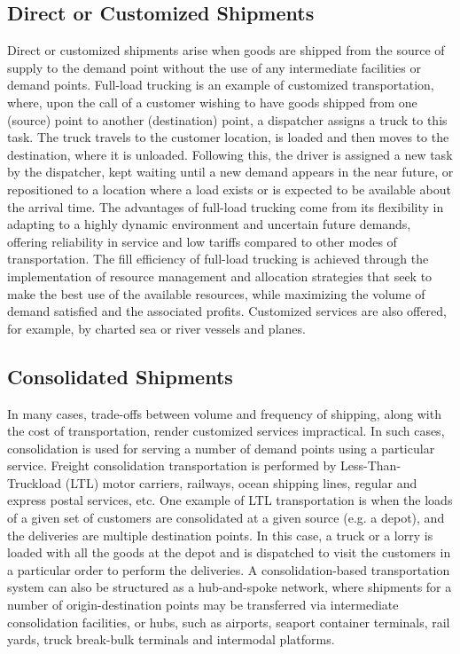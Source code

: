 \subsection{Direct or Customized Shipments }
Direct or customized shipments arise when goods are shipped from the source of supply to the demand point without the use of any intermediate facilities or demand points. Full-load trucking is an example of customized transportation, where, upon the call of a customer wishing to have goods shipped from one (source) point to another (destination) point, a dispatcher assigns a truck to this task. The truck travels to the customer location, is loaded and then moves to the destination, where it is unloaded. Following this, the driver is assigned a new task by the dispatcher, kept waiting until a new demand appears in the near future, or repositioned to a location where a load exists or is expected to be available about the arrival time. The advantages of full-load trucking come from its flexibility in adapting to a highly dynamic environment and uncertain future demands, offering reliability in service and low tariffs compared to other modes of transportation. The fill efficiency of full-load trucking is achieved through the implementation of resource management and allocation strategies that seek to make the best use of the available resources, while maximizing the volume of demand satisfied and the associated profits. Customized services are also offered, for example, by charted sea or river vessels and planes.
%
\subsection{Consolidated Shipments}
In many cases, trade-offs between volume and frequency of shipping, along with the cost of transportation, render customized services impractical. In such cases, consolidation is used for serving a number of demand points using a particular service. Freight consolidation transportation is performed by Less-Than-Truckload (LTL) motor carriers, railways, ocean shipping lines, regular and express postal services, etc. One example of LTL transportation is when the loads of a given set of customers are consolidated at a given source (e.g. a depot), and the deliveries are multiple destination points. In this case, a truck or a lorry is loaded with all the goods at the depot and is dispatched to visit the customers in a particular order to perform the deliveries. A consolidation-based transportation system can also be structured as a hub-and-spoke network, where shipments for a number of origin-destination points may be transferred via intermediate consolidation facilities, or hubs, such as airports, seaport container terminals, rail yards, truck break-bulk terminals and intermodal platforms.
%
